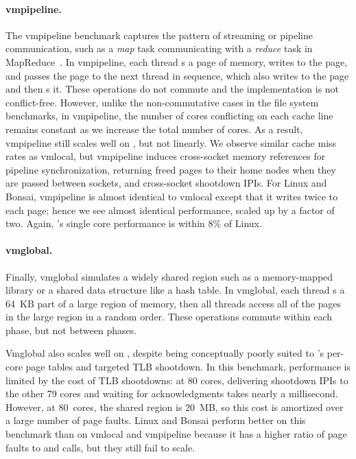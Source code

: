 \paragraph{vmpipeline.} The vmpipeline benchmark captures the pattern
of streaming or pipeline communication, such as a \emph{map} task
communicating with a \emph{reduce} task in
MapReduce~\cite{dean:mapreduce}.
%
In vmpipeline, each thread s a page of memory, writes to
the page, and passes the page to the next thread in sequence, which
also writes to the page and then s it.
%
These operations do not commute and the implementation is not
conflict-free.
%
However, unlike the non-commutative cases in the file system
benchmarks, in vmpipeline, the number of cores conflicting on each
cache line remains constant as we increase the total number of cores.
%
As a result, vmpipeline still scales well on \sys, but not linearly.
%
We observe similar cache miss rates as vmlocal, but vmpipeline induces
cross-socket memory references for pipeline synchronization, returning
freed pages to their home nodes when they are passed between sockets,
and cross-socket shootdown IPIs.
For Linux and Bonsai, vmpipeline is almost identical to vmlocal except
that it writes twice to each page; hence we see almost identical
performance, scaled up by a factor of two.
%
Again, \sys's single core performance is within 8\% of Linux.


\paragraph{vmglobal.} Finally, vmglobal simulates a widely shared
region such as a memory-mapped library or a shared data structure like
a hash table.
%
In vmglobal, each thread s a 64~KB part of a large region
of memory, then all threads access all of the pages in the large
region in a random order.
%
These operations commute within each phase, but not between phases.

Vmglobal also scales well on \sys, despite being conceptually poorly
suited to \sys's per-core page tables and targeted TLB shootdown.  In
this benchmark, \sys performance is limited by the cost of TLB
shootdowns: at 80 cores, delivering shootdown IPIs to the other 79
cores and waiting for acknowledgments takes nearly a millisecond.
However, at 80~cores, the shared region is 20~MB, so this cost is
amortized over a large number of page faults.
%
Linux and Bonsai perform better on this benchmark than on vmlocal and
vmpipeline because it has a higher ratio of page faults to 
and  calls, but they still fail to scale.


